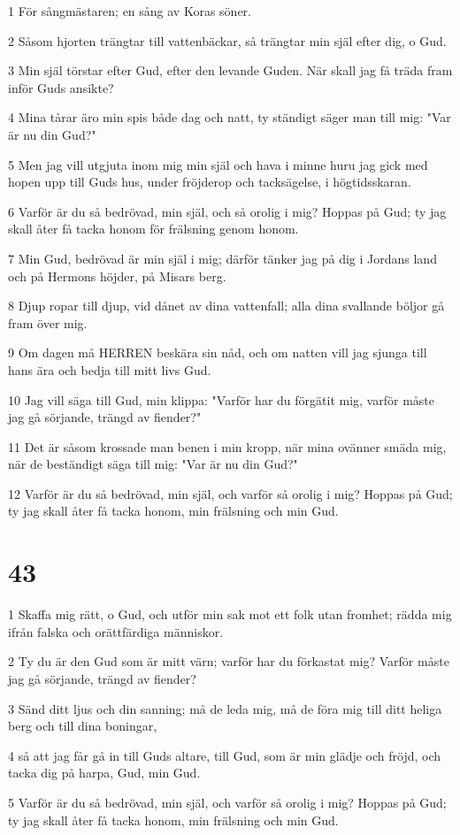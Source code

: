 \par 1 För sångmästaren; en sång av Koras söner.
\par 2 Såsom hjorten trängtar till vattenbäckar, så trängtar min själ efter dig, o Gud.
\par 3 Min själ törstar efter Gud, efter den levande Guden. När skall jag få träda fram inför Guds ansikte?
\par 4 Mina tårar äro min spis både dag och natt, ty ständigt säger man till mig: "Var är nu din Gud?"
\par 5 Men jag vill utgjuta inom mig min själ och hava i minne huru jag gick med hopen upp till Guds hus, under fröjderop och tacksägelse, i högtidsskaran.
\par 6 Varför är du så bedrövad, min själ, och så orolig i mig? Hoppas på Gud; ty jag skall åter få tacka honom för frälsning genom honom.
\par 7 Min Gud, bedrövad är min själ i mig; därför tänker jag på dig i Jordans land och på Hermons höjder, på Misars berg.
\par 8 Djup ropar till djup, vid dånet av dina vattenfall; alla dina svallande böljor gå fram över mig.
\par 9 Om dagen må HERREN beskära sin nåd, och om natten vill jag sjunga till hans ära och bedja till mitt livs Gud.
\par 10 Jag vill säga till Gud, min klippa: "Varför har du förgätit mig, varför måste jag gå sörjande, trängd av fiender?"
\par 11 Det är såsom krossade man benen i min kropp, när mina ovänner smäda mig, när de beständigt säga till mig: "Var är nu din Gud?"
\par 12 Varför är du så bedrövad, min själ, och varför så orolig i mig? Hoppas på Gud; ty jag skall åter få tacka honom, min frälsning och min Gud.

\chapter{43}

\par 1 Skaffa mig rätt, o Gud, och utför min sak mot ett folk utan fromhet; rädda mig ifrån falska och orättfärdiga människor.
\par 2 Ty du är den Gud som är mitt värn; varför har du förkastat mig? Varför måste jag gå sörjande, trängd av fiender?
\par 3 Sänd ditt ljus och din sanning; må de leda mig, må de föra mig till ditt heliga berg och till dina boningar,
\par 4 så att jag får gå in till Guds altare, till Gud, som är min glädje och fröjd, och tacka dig på harpa, Gud, min Gud.
\par 5 Varför är du så bedrövad, min själ, och varför så orolig i mig? Hoppas på Gud; ty jag skall åter få tacka honom, min frälsning och min Gud.

